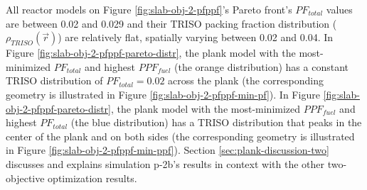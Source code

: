 All reactor models on Figure \ref{fig:slab-obj-2-pfppf}'s Pareto front's $PF_{total}$ 
values are between 0.02 and 0.029 and their TRISO packing fraction distribution 
($\rho_{TRISO}(\vec{r})$) are relatively flat, spatially varying between 0.02 and 0.04. 
In Figure \ref{fig:slab-obj-2-pfppf-pareto-distr}, the plank model with the 
most-minimized $PF_{total}$ and highest $PPF_{fuel}$
(the orange distribution) has a constant TRISO distribution of $PF_{total}=0.02$ 
across the plank (the corresponding geometry is illustrated in Figure 
\ref{fig:slab-obj-2-pfppf-min-pf}). 
In Figure \ref{fig:slab-obj-2-pfppf-pareto-distr}, the plank model with the 
most-minimized $PPF_{fuel}$ and highest $PF_{total}$
(the blue distribution) has a TRISO distribution that peaks in the center of the plank
and on both sides (the corresponding geometry is illustrated in 
Figure \ref{fig:slab-obj-2-pfppf-min-ppf}). 
Section \ref{sec:plank-discussion-two} discusses and explains simulation p-2b's results
in context with the other two-objective optimization results.

